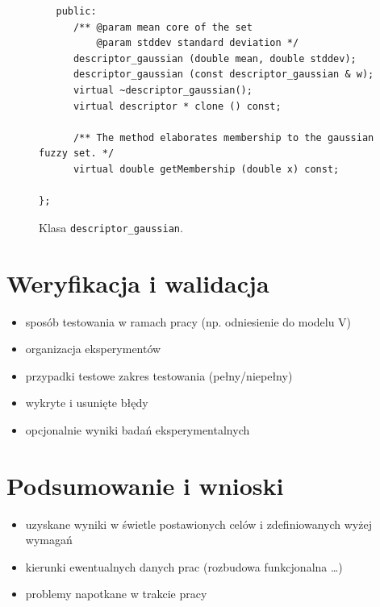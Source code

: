 \documentclass[a4paper,twoside,12pt]{book}
\begin{document}
{{\begin{figure}
\begin{lstlisting}
   public:
      /** @param mean core of the set
          @param stddev standard deviation */
      descriptor_gaussian (double mean, double stddev);
      descriptor_gaussian (const descriptor_gaussian & w);
      virtual ~descriptor_gaussian();
      virtual descriptor * clone () const;
      
      /** The method elaborates membership to the gaussian fuzzy set. */
      virtual double getMembership (double x) const;
     
};
\end{lstlisting}
\caption{Klasa \lstinline|descriptor_gaussian|.}
\label{fig:pseudokod}
\end{figure}


\chapter{Weryfikacja i walidacja}
\begin{itemize}
\item sposób testowania w ramach pracy (np. odniesienie do modelu V)
\item organizacja eksperymentów
\item przypadki testowe zakres testowania (pełny/niepełny)
\item wykryte i usunięte błędy
\item opcjonalnie wyniki badań eksperymentalnych
\end{itemize}
 


\chapter{Podsumowanie i wnioski}
\begin{itemize}
\item uzyskane wyniki w świetle postawionych celów i zdefiniowanych wyżej wymagań
\item kierunki ewentualnych danych prac (rozbudowa funkcjonalna …)
\item problemy napotkane w trakcie pracy
\end{itemize}


}}
\end{document}
